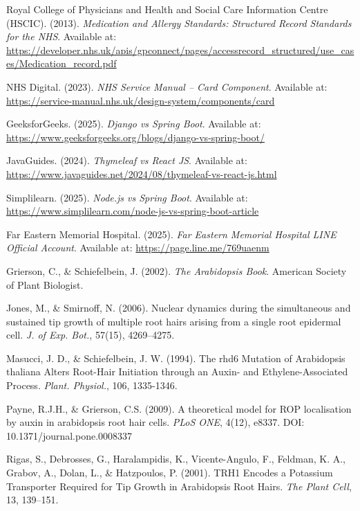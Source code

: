 \begin{thebibliography}{99}
    Royal College of Physicians and Health and Social Care Information Centre (HSCIC). (2013). \emph{Medication and Allergy Standards: Structured Record Standards for the NHS}.
    Available at: \url{https://developer.nhs.uk/apis/gpconnect/pages/accessrecord_structured/use_cases/Medication_record.pdf}

    NHS Digital. (2023). \emph{NHS Service Manual – Card Component}.
    Available at: \url{https://service-manual.nhs.uk/design-system/components/card}

    GeeksforGeeks. (2025). \emph{Django vs Spring Boot}.
    Available at: \url{https://www.geeksforgeeks.org/blogs/django-vs-spring-boot/}

    JavaGuides. (2024). \emph{Thymeleaf vs React JS}.
    Available at: \url{https://www.javaguides.net/2024/08/thymeleaf-vs-react-js.html}

    Simplilearn. (2025). \emph{Node.js vs Spring Boot}.
    Available at: \url{https://www.simplilearn.com/node-js-vs-spring-boot-article}

    Far Eastern Memorial Hospital. (2025). \emph{Far Eastern Memorial Hospital LINE Official Account}.
    Available at: \url{https://page.line.me/769uaenm}

    Grierson, C., \& Schiefelbein, J. (2002). \emph{The Arabidopsis Book}. American Society of Plant Biologist.

    Jones, M., \& Smirnoff, N. (2006). Nuclear dynamics during the simultaneous and sustained tip growth of multiple root hairs arising from a single root epidermal cell. \emph{J. of Exp. Bot.}, 57(15), 4269--4275.

    Masucci, J. D., \& Schiefelbein, J. W. (1994). The rhd6 Mutation of Arabidopsis thaliana Alters Root-Hair Initiation through an Auxin- and Ethylene-Associated Process. \emph{Plant. Physiol.}, 106, 1335-1346.

    Payne, R.J.H., \& Grierson, C.S. (2009). A theoretical model for ROP localisation by auxin in arabidopsis root hair cells. \emph{PLoS ONE}, 4(12), e8337.
    DOI: 10.1371/journal.pone.0008337

    Rigas, S., Debrosses, G., Haralampidis, K., Vicente-Angulo, F., Feldman, K. A., Grabov, A., Dolan, L., \& Hatzpoulos, P. (2001). TRH1 Encodes a Potassium Transporter Required for Tip Growth in Arabidopsis Root Hairs. \emph{The Plant Cell}, 13, 139--151.

\end{thebibliography}
